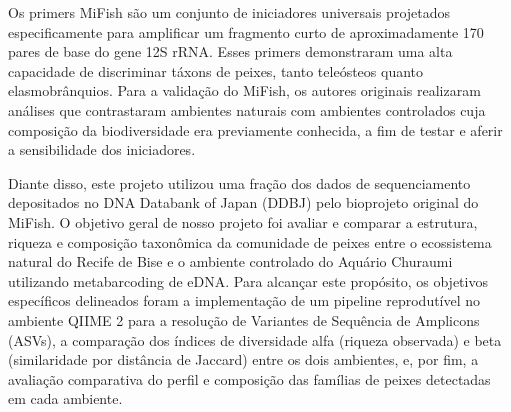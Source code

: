 Os primers MiFish \cite{Miya.etal2015a} são um conjunto de iniciadores universais projetados especificamente para amplificar um fragmento curto de aproximadamente 170 pares de base do gene 12S rRNA. Esses primers demonstraram uma alta capacidade de discriminar táxons de peixes, tanto teleósteos quanto elasmobrânquios. Para a validação do MiFish, os autores originais realizaram análises que contrastaram ambientes naturais com ambientes controlados cuja composição da biodiversidade era previamente conhecida, a fim de testar e aferir a sensibilidade dos iniciadores.

Diante disso, este projeto utilizou uma fração dos dados de sequenciamento depositados no DNA Databank of Japan (DDBJ) pelo bioprojeto original do MiFish. O objetivo geral de nosso projeto foi avaliar e comparar a estrutura, riqueza e composição taxonômica da comunidade de peixes entre o ecossistema natural do Recife de Bise e o ambiente controlado do Aquário Churaumi utilizando metabarcoding de eDNA. Para alcançar este propósito, os objetivos específicos delineados foram a implementação de um pipeline reprodutível no ambiente QIIME 2 para a resolução de Variantes de Sequência de Amplicons (ASVs), a comparação dos índices de diversidade alfa (riqueza observada) e beta (similaridade por distância de Jaccard) entre os dois ambientes, e, por fim, a avaliação comparativa do perfil e composição das famílias de peixes detectadas em cada ambiente.